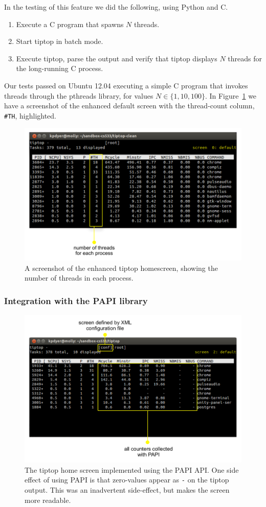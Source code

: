 In the testing of this feature we did the following, using Python and C.
\begin{enumerate}
\item Execute a C program that spawns $N$ threads.
\item Start tiptop in batch mode.
\item Execute tiptop, parse the output and verify that tiptop displays $N$ threads for the long-running C process.
\end{enumerate}

Our tests passed on Ubuntu 12.04 executing a simple C program that invokes threads through the pthreads library, for values $N\in\{1,10,100\}$.
In Figure~\ref{fig:tiptop-threads} we have a screenshot of the enhanced default screen with the thread-count column, \texttt{\#TH}, highlighted.

\begin{figure}[t]
\footnotesize
\centering
\includegraphics[width=.7\textwidth]{tiptop-threads}
\caption{A screenshot of the enhanced tiptop homescreen, showing the number of threads in each process.}
\label{fig:tiptop-threads}
\end{figure}

\subsubsection{Integration with the PAPI library}
\begin{figure}[t]
\footnotesize
\centering
\includegraphics[width=.7\textwidth]{tiptop-papi}
\caption{The tiptop home screen implemented using the PAPI API. One side effect of using PAPI is that zero-values appear as \texttt{-} on the tiptop output. This was an inadvertent side-effect, but makes the screen more readable.}
\label{fig:tiptop-papi}
\end{figure}

